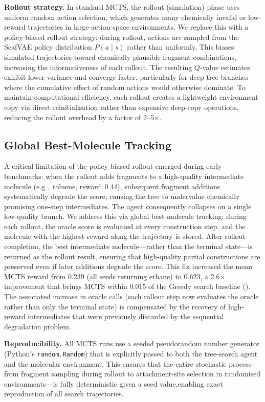 \documentclass[jcim,article,layout=manuscript]{achemso}
\begin{document}
\textbf{Rollout strategy.} In standard MCTS, the rollout (simulation) phase
uses uniform random action selection, which generates many chemically
invalid or low-reward trajectories in large-action-space environments.
We replace this with a policy-biased rollout strategy: during rollout,
actions are sampled from the ScafVAE policy distribution $P(a\mid s)$
rather than uniformly. This biases simulated trajectories toward chemically
plausible fragment combinations, increasing the informativeness of each
rollout. The resulting $Q$-value estimates exhibit lower variance and
converge faster, particularly for deep tree branches where the cumulative
effect of random actions would otherwise dominate. To maintain computational
efficiency, each rollout creates a lightweight environment copy via direct
reinitialisation rather than expensive deep-copy operations, reducing the
rollout overhead by a factor of 2--5$\times$.

\subsection{Global Best-Molecule Tracking}
\label{sec:rollout_fix}
A critical
limitation of the policy-biased rollout emerged during early benchmarks:
when the rollout adds fragments to a high-quality intermediate molecule
(e.g.,~toluene, reward~0.44), subsequent fragment additions systematically
degrade the score, causing the tree to undervalue chemically promising
one-step intermediates. The agent consequently collapses on a single
low-quality branch. We address this via global best-molecule tracking:
during each rollout, the oracle score is evaluated at every construction
step, and the molecule with the highest reward along the trajectory is
stored. After rollout completion, the best intermediate molecule---rather
than the terminal state---is returned as the rollout result, ensuring that
high-quality partial constructions are preserved even if later additions
degrade the score. This fix increased the mean MCTS reward from 0.239
(all seeds returning ethane) to 0.623, a 2.6$\times$ improvement that
brings MCTS within 0.015 of the Greedy search baseline (). The associated
increase in oracle calls (each rollout step now evaluates the oracle
rather than only the terminal state) is compensated by the recovery of
high-reward intermediates that were previously discarded by the sequential
degradation problem.

\textbf{Reproducibility.} All MCTS runs use a seeded pseudorandom number
generator (Python's \texttt{random.Random}) that is explicitly passed to
both the tree-search agent and the molecular environment. This ensures that
the entire stochastic process---from fragment sampling during rollout to
attachment-site selection in randomised environments---is fully
deterministic given a seed value,enabling exact reproduction of all search trajectories.
\end{document}
